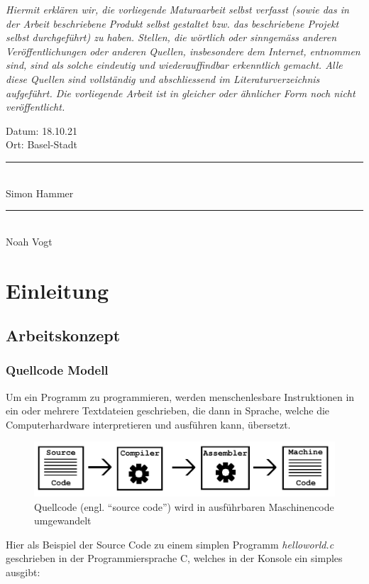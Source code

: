 \documentclass[a4paper,11pt]{article}
\newcommand{\doublesignature}[3][Simon Hammer]{%
  \parbox{\textwidth}{
    \vspace{2cm}
    \centering Datum: #3 \\
    Ort: Basel-Stadt \\

    \parbox{7cm}{
      \centering
      \rule{6cm}{1pt}\\
       #1 
    }
    \hfill
    \parbox{7cm}{
      \centering
      \rule{6cm}{1pt}\\
      #2
    }
  }
}
\begin{document}
{
\textit{Hiermit erklären wir, die vorliegende Maturaarbeit selbst verfasst (sowie das in der Arbeit
beschriebene Produkt selbst gestaltet bzw. das beschriebene Projekt selbst durchgeführt) zu
haben. Stellen, die wörtlich oder sinngemäss anderen Veröffentlichungen oder anderen Quellen,
insbesondere dem Internet, entnommen sind, sind als solche eindeutig und wiederauffindbar
erkenntlich gemacht. Alle diese Quellen sind vollständig und abschliessend im
Literaturverzeichnis aufgeführt. Die vorliegende Arbeit ist in gleicher oder ähnlicher Form noch
nicht veröffentlicht. } \\

\doublesignature{Noah Vogt}{18.10.21}

}

\newpage

\section{Einleitung}

\subsection{Arbeitskonzept}

\subsubsection{Quellcode Modell}
Um ein Programm zu programmieren, werden menschenlesbare Instruktionen in ein oder mehrere Textdateien geschrieben,
die dann in Sprache, welche die Computerhardware interpretieren und ausführen kann, übersetzt.

\begin{figure}[H]
    \centering
    \includegraphics[width=.8\textwidth]{media/Source2Executable.jpg}
    \caption{Quellcode (engl. ``source code'') wird in ausführbaren Maschinencode umgewandelt \cite{stallman2002}}
\end{figure}

Hier als Beispiel der Source Code zu einem simplen Programm \textit{helloworld.c} geschrieben in der Programmiersprache C, welches in der Konsole ein simples  ausgibt:
\end{document}
